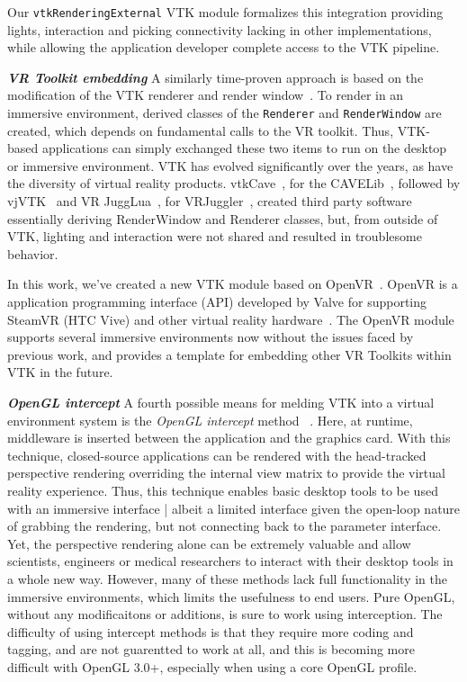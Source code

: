 Our \texttt{vtkRenderingExternal} VTK module formalizes this integration providing lights, interaction and picking connectivity lacking in other implementations, while allowing the application developer complete access to the VTK pipeline.

\textbf{\textit{VR Toolkit embedding}} A similarly time-proven approach is based on the modification of the VTK renderer and render window~\cite{van2000vista, Hannema:2001, Shamonin02vtkcave, Belleman:2003}.
To render in an immersive environment, derived classes of the \texttt{Renderer} and \texttt{RenderWindow} are created, which depends on fundamental calls to the VR toolkit.
Thus, VTK-based applications can simply exchanged these two items to run on the desktop or immersive environment.
VTK has evolved significantly over the years, as have the diversity of virtual reality products.
vtkCave~\cite{Tufo:1999}, for the CAVELib~\cite{CAVELib:2016}, followed by vjVTK~\cite{Blom:2006} and VR JuggLua~\cite{Pavlik:2012}, for VRJuggler~\cite{Bierbaum:2001}, created third party software essentially deriving RenderWindow and Renderer classes, but, from outside of VTK, lighting and interaction were not shared and resulted in troublesome behavior.

In this work, we've created a new VTK module based on OpenVR~\cite{OpenVR:2016}.
OpenVR is a application programming interface (API) developed by Valve for supporting  SteamVR (HTC Vive) and other virtual reality hardware~\cite{Road2VR:2015}.
The OpenVR module supports several immersive environments now without the issues faced by previous work, and provides a template for embedding other VR Toolkits within VTK in the future.

\textit{\textbf{OpenGL intercept}}
A fourth possible means for melding VTK into a virtual environment system
is the \textit{OpenGL intercept} method
~\cite{Humphreys:2001,Humphreys:2002,Zielinski:2014,TechViz:2016,Conduit:2016}.
Here, at runtime, middleware is inserted between the application and the graphics card.
With this technique, closed-source applications can be rendered with
the head-tracked perspective rendering overriding the internal view matrix
to provide the virtual reality experience.
Thus, this technique enables basic desktop tools to be used with an
immersive interface | albeit a limited interface given the open-loop nature of
grabbing the rendering, but not connecting back to the parameter interface.
Yet, the perspective rendering alone can be extremely valuable and allow
scientists, engineers or medical researchers to interact with their desktop
tools in a whole new way. However, many of these methods lack full functionality in the immersive environments, which limits the usefulness to end users.
Pure OpenGL, without any modificaitons or additions,  is sure to work using interception.
The difficulty of using intercept methods is that they require more coding
and tagging, and are not guarentted to work at all, and this is becoming
more difficult with OpenGL 3.0+, especially when using a core OpenGL profile.

